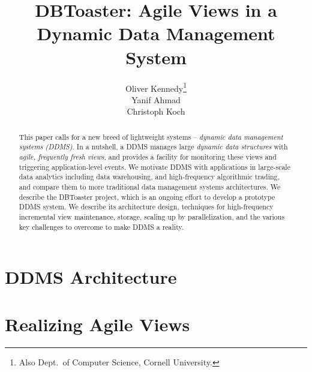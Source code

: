 \documentclass{sig-alternate}
\begin{document}
\title{DBToaster: Agile Views in a\\Dynamic Data Management System}
\author{
\alignauthor
Oliver Kennedy\thanks{Also Dept.\ of Computer Science, Cornell University.}\\
\alignauthor
Yanif Ahmad\\
\alignauthor
Christoph Koch\\
}
\maketitle

\begin{abstract}
This paper calls for a new breed of lightweight systems --
{\em dynamic data management systems (DDMS)}\/.
In a nutshell,
a DDMS manages large {\em dynamic data structures}\/ with 
{\em agile, frequently fresh views}\/, and provides a facility for monitoring
these views and triggering application-level events.
%
We motivate DDMS with applications in large-scale data analytics
including data warehousing, and high-frequency algorithmic trading,
and compare them to more traditional data management systems 
architectures.
%
We describe the DBToaster project, which is an ongoing effort to
develop a prototype DDMS system. We describe its architecture
design, techniques for high-frequency incremental view maintenance,
storage, scaling up by parallelization, and
the various key challenges to overcome to make DDMS a reality.
\end{abstract}



\section{DDMS Architecture}
\label{sec:overview}



\section{Realizing Agile Views}
\label{sec:dbtoaster}

\end{document}
